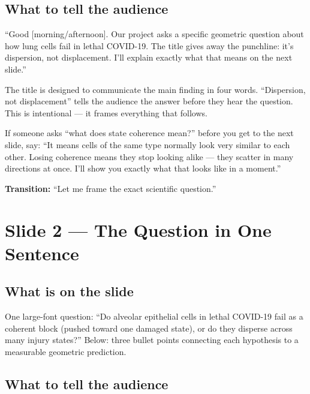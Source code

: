 \documentclass[11pt]{article}
\begin{document}
\subsection{What to tell the audience}

\begin{speaknote}
``Good [morning/afternoon]. Our project asks a specific geometric question about how lung cells fail in lethal COVID-19. The title gives away the punchline: it's dispersion, not displacement. I'll explain exactly what that means on the next slide.''
\end{speaknote}

\begin{whyblock}
The title is designed to communicate the main finding in four words. ``Dispersion, not displacement'' tells the audience the answer before they hear the question. This is intentional --- it frames everything that follows.
\end{whyblock}

\begin{pitfall}
If someone asks ``what does state coherence mean?'' before you get to the next slide, say: ``It means cells of the same type normally look very similar to each other. Losing coherence means they stop looking alike --- they scatter in many directions at once. I'll show you exactly what that looks like in a moment.''
\end{pitfall}

\textbf{Transition:} ``Let me frame the exact scientific question.''


\section{Slide 2 --- The Question in One Sentence}

\subsection{What is on the slide}

One large-font question: ``Do alveolar epithelial cells in lethal COVID-19 fail as a coherent block (pushed toward one damaged state), or do they disperse across many injury states?'' Below: three bullet points connecting each hypothesis to a measurable geometric prediction.

\subsection{What to tell the audience}
\end{document}
